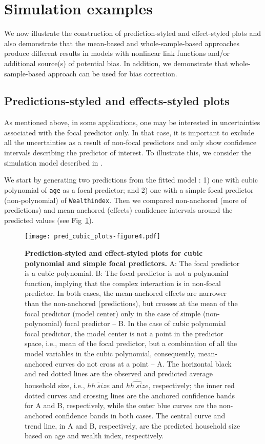 \documentclass[10pt,letterpaper]{article}
\def\code#1{\texttt{#1}}
\let\over=\overline
\begin{document}
\section*{Simulation examples}

We now illustrate the construction of prediction-styled and effect-styled plots and also demonstrate that the mean-based and whole-sample-based approaches produce different results in models with nonlinear link functions and/or additional source(s) of potential bias. In addition, we demonstrate that whole-sample-based approach can be used for bias correction.

\subsection*{Predictions-styled and effects-styled plots}

As mentioned above, in some applications, one may be interested in uncertainties associated with the focal predictor only. In that case, it is important to exclude all the uncertainties as a result of non-focal predictors and only show confidence intervals describing the predictor of interest. To illustrate this, we consider the simulation model described in . 

We start by generating two predictions from the fitted model : 1) one with cubic polynomial of \code{age} as a focal predictor; and 2) one with a simple focal predictor (non-polynomial) of \code{Wealthindex}. Then we compared non-anchored (more of predictions) and mean-anchored (effects) confidence intervals around the predicted values (see Fig~\ref{fig:pred_cubic_plots}).

\begin{figure}[!h]
\centering
\texttt{[image: pred\_cubic\_plots-figure4.pdf]}
\caption{{\bf Prediction-styled and effect-styled plots for cubic polynomial and simple focal predictors.} A: The focal predictor is a cubic polynomial. B: The focal predictor is not a polynomial function, implying that the complex interaction is in non-focal predictor. In both cases, the mean-anchored effects are narrower than the non-anchored (predictions), but crosses at the mean of the focal predictor (model center) only in the case of simple (non-polynomial) focal predictor -- B. In the case of cubic polynomial focal predictor, the model center is not a point in the predictor space, i.e., mean of the focal predictor, but a combination of all the model variables in the cubic polynomial, consequently, mean-anchored curves do not cross at a point -- A. The horizontal black and red dotted lines are the observed and predicted average household size, i.e., $\over{hh~size}$ and $\over{\widehat{hh~size}}$, respectively; the inner red dotted curves and crossing lines are the anchored confidence bands for A and B, respectively, while the outer blue curves are the non-anchored confidence bands in both cases. The central curve and trend line, in A and B, respectively, are the predicted household size based on age and wealth index, respectively.}
\label{fig:pred_cubic_plots}
\end{figure}
\end{document}
